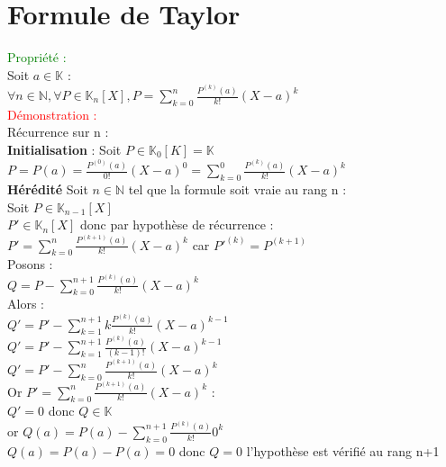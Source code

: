 \documentclass{article}
\begin{document}
\section{Formule de Taylor}
\textcolor{green}{Propriété :} \\
Soit $a \in \mathbb K$ : \\
$\forall n \in \mathbb N, \forall P \in \mathbb K_n[X],P= \sum_{k=0}^n \frac{P^{(k)}(a)}{k!}(X-a)^k$  \\
\textcolor{red}{Démonstration :} \\
Récurrence sur n : \\
{\bf Initialisation} : Soit $P \in \mathbb K_0 [K]=\mathbb K$ \\
$P=P(a)=\frac{P^{(0)}(a)}{0!}(X-a)^0= \sum_{k=0}^0\frac{P^{(k)}(a)}{k!}(X-a)^k $ \\
{\bf Hérédité} Soit $n \in \mathbb N$ tel que la formule soit vraie au rang n  : \\
Soit $P \in \mathbb K_{n-1}[X]$ \\
$P' \in \mathbb K_n[X]$ donc par hypothèse de récurrence : \\
$P'=\sum_{k=0}^n \frac{P^{(k+1)}(a)}{k!}(X-a)^k$ car $P'^{(k)}=P^{(k+1)}$ \\
Posons : \\
$Q=P- \sum_{k=0}^{n+1}\frac{P^{(k)}(a)}{k!}(X-a)^k$ \\
Alors : \\
$Q'=P'-\sum_{k=1}^{n+1} k\frac{P^{(k)}(a)}{k!}(X-a)^{k-1} $ \\
$Q'=P'-\sum_{k=1}^{n+1} \frac{P^{(k)}(a)}{(k-1)!}(X-a)^{k-1} $ \\
$Q'=P'- \sum_{k=0}^n \frac{P^{(k+1)}(a)}{k!}(X-a)^k$ \\
Or $P'=\sum_{k=0}^n \frac{P^{(k+1)}(a)}{k!}(X-a)^k$ : \\
$Q'=0$ donc $Q \in \mathbb K$ \\
or $Q(a)= P(a)-\sum_{k=0}^{n+1} \frac{P^{(k)}(a)}{k!}0^k$ \\
$Q(a)=P(a)-P(a)=0$ donc $Q=0$ l'hypothèse est vérifié au rang n+1
\end{document}
